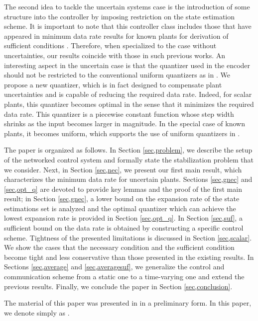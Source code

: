 \documentclass[a4paper, 11pt]{article}
\theoremstyle{definition}
\begin{document}
The second idea to tackle the uncertain systems case is the introduction
of some structure into the controller by imposing restriction on the state
estimation scheme.
It is important to note that this controller class includes those that
have appeared in minimum data rate results for known plants for derivation
of sufficient conditions \cite{Tatikonda2004, Tatikonda2004a, You2010}.
Therefore, when specialized to the case without uncertainties, our results
coincide with those in such previous works. An interesting aspect in the uncertain case is that the quantizer used
in the encoder should not be restricted to the conventional uniform quantizers
as in \cite{Phat2004, Martins2006, Okano2012}.
We propose a new quantizer, which is in fact designed to compensate plant
uncertainties and is capable of reducing the required data rate.
Indeed, for scalar plants, this quantizer becomes optimal in the sense that
it minimizes the required data rate.
This quantizer is a piecewise constant function whose step width shrinks
as the input becomes larger in magnitude.
In the special case of known plants, it becomes uniform, which supports
the use of uniform quantizers in \cite{You2010}.

The paper is organized as follows.
In Section \ref{sec,problem}, we describe the setup of the networked
control system and formally state the stabilization problem that we consider.
Next, in Section \ref{sec,nec}, we present our first main result, which
characterizes the minimum data rate for uncertain plants.
Sections \ref{sec,gnec} and \ref{sec,opt_q} are devoted to provide key lemmas
and the proof of the first main result;
in Section \ref{sec,gnec}, a lower bound on the expansion rate of the
state estimations set is analyzed and the optimal quantizer which can
achieve the lowest expansion rate is provided in Section \ref{sec,opt_q}.
In Section \ref{sec,suf}, a sufficient bound on the data rate is obtained
by constructing a specific control scheme.
Tightness of the presented limitations is discussed in Section \ref{sec,scalar}.
We show the cases that the necessary condition and the sufficient condition
become tight and less conservative than those presented in the existing results.
In Sections \ref{sec,average} and \ref{sec,averagesuf}, we generalize the
control and communication scheme from a static one to a time-varying one
and extend the previous results.
Finally, we conclude the paper in Section \ref{sec,conclusion}.

The material of this paper was presented in \cite{Okano2012b} in
a preliminary form.
In this paper, we denote  simply as .
\end{document}
